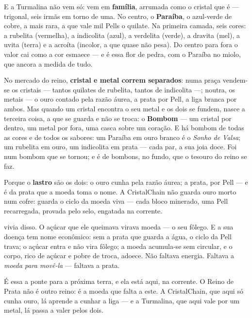 \documentclass[livro.tex]{subfiles}
\begin{document}
\medskip

E a Turmalina não vem só: vem em \textbf{família}, arrumada como o cristal que é ---
trigonal, seis irmãs em torno de uma. No centro, o \textbf{Paraíba}, o azul-verde de
cobre, a mais rara, a que vale mil Pells o quilate. Na primeira camada, seis cores: a
rubelita (vermelha), a indicolita (azul), a verdelita (verde), a dravita (mel), a
uvita (terra) e a acroíta (incolor, a que quase não pesa). Do centro para fora o valor
cai como a cor esmaece --- e é essa flor de pedra, com o Paraíba no miolo, que ancora
a medida de tudo.

\medskip

No mercado do reino, \textbf{cristal e metal correm separados}: numa praça vendem-se
os cristais --- tantos quilates de rubelita, tantos de indicolita ---; noutra, os
metais --- o ouro contado pela razão áurea, a prata por Pell, a liga branca por ambos.
Mas quando um cristal encontra o seu metal e os dois se fundem, nasce a terceira
coisa, a que se guarda e não se troca: o \textbf{Bombom} --- um cristal por dentro, um
metal por fora, uma casca sobre um coração. E há bombom de todas as cores e de todos
os sabores: um Paraíba em ouro branco é o \emph{Sonho de Valsa}; um rubelita em ouro,
um indicolita em prata --- cada par, a sua joia doce. Foi num bombom que \Ven se
tornou; e é de bombons, no fundo, que o tesouro do reino se faz.

\medskip

Porque o \textbf{lastro} são os dois: o ouro cunha pela razão áurea; a
prata, por Pell --- e é da prata que a moeda toma o nome. A CristalChain
não guarda ouro morto num cofre: guarda o ciclo da moeda viva --- cada bloco minerado,
uma Pell recarregada, provada pelo selo, engatada na corrente.

\medskip

\Ven vivia disso. O açúcar que ele queimava virava moeda --- o seu fôlego. E a sua
doença tem nome econômico: sem a prata que guarda a água, o ciclo da Pell trava; o
açúcar entra e não vira fôlego; a moeda acumula-se sem circular, e o corpo, rico de
açúcar e pobre de troca, adoece. Não faltava energia. Faltava a \emph{moeda para
movê-la} --- faltava a prata.

\medskip

É essa a ponte para a próxima terra, e ela está aqui, na corrente. O Reino de Prata
não é outro reino: é a moeda que falta a este. A CristalChain, que aqui só cunha ouro,
lá aprende a cunhar a liga --- e a Turmalina, que aqui vale por um metal, lá passa a
valer pelos dois.
\end{document}
